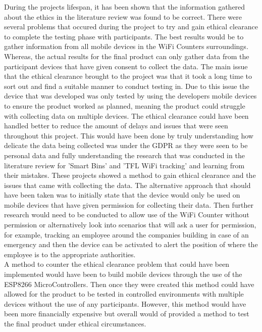 \documentclass{report}
\begin{document}
During the projects lifespan, it has been shown that the information gathered about the ethics in the literature review was found to be correct. There were several problems that occured during the project to try and gain ethical clearance to complete the testing phase with participants. The best results would be to gather information from all mobile devices in the WiFi Counters surroundings. Whereas, the actual results for the final product can only gather data from the participant devices that have given consent to collect the data. The main issue that the ethical clearance brought to the project was that it took a long time to sort out and find a suitable manner to conduct testing in. Due to this issue the device that was developed was only tested by using the developers mobile devices to ensure the product worked as planned, meaning the product could struggle with collecting data on multiple devices. The ethical clearance could have been handled better to reduce the amount of delays and issues that were seen throughout this project. This would have been done by truly understanding how delicate the data being collected was under the GDPR\cite{GDPR} as they were seen to be personal data and fully understanding the research that was conducted in the literature review for 'Smart Bins'\cite{Smart_bins} and 'TFL WiFi tracking'\cite{GizmodoLondon} and learning from their mistakes. These projects showed a method to gain ethical clearance and the issues that came with collecting the data. The alternative approach that should have been taken was to initially state that the device would only be used on mobile devices that have given permission for collecting their data. Then further research would need to be conducted to allow use of the WiFi Counter without permission or alternatively look into scenarios that will ask a user for permission, for example, tracking an employee around the companies building in case of an emergency and then the device can be activated to alert the position of where the employee is to the appropriate authorities. \\ \newline
A method to counter the ethical clearance problem that could have been implemented would have been to build mobile devices through the use of the ESP8266 MicroControllers. Then once they were created this method could have allowed for the product to be tested in controlled environments with multiple devices without the use of any participants. However, this method would have been more financially expensive but overall would of provided a method to test the final product under ethical circumstances.\\ \newline
\end{document}
